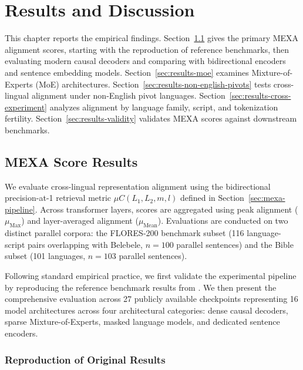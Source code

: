 \chapter{Results and Discussion}
\label{ch:results}

This chapter reports the empirical findings. Section~\ref{sec:results-mexa} gives the primary MEXA alignment scores, starting with the reproduction of reference benchmarks, then evaluating modern causal decoders and comparing with bidirectional encoders and sentence embedding models. Section~\ref{sec:results-moe} examines Mixture-of-Experts (MoE) architectures. Section~\ref{sec:results-non-english-pivots} tests cross-lingual alignment under non-English pivot languages. Section~\ref{sec:results-cross-experiment} analyzes alignment by language family, script, and tokenization fertility. Section~\ref{sec:results-validity} validates MEXA scores against downstream benchmarks.

\section{MEXA Score Results}
\label{sec:results-mexa}

We evaluate cross-lingual representation alignment using the bidirectional precision-at-1 retrieval metric $\mu C(L_1, L_2, m, l)$ defined in Section~\ref{sec:mexa-pipeline}. Across transformer layers, scores are aggregated using peak alignment ($\mu_{\text{Max}}$) and layer-averaged alignment ($\mu_{\text{Mean}}$). Evaluations are conducted on two distinct parallel corpora: the FLORES-200 benchmark subset (116 language-script pairs overlapping with Belebele, $n = 100$ parallel sentences) and the Bible subset (101 languages, $n = 103$ parallel sentences).

Following standard empirical practice, we first validate the experimental pipeline by reproducing the reference benchmark results from \citet{kargaran2025mexa}. We then present the comprehensive evaluation across 27 publicly available checkpoints representing 16 model architectures across four architectural categories: dense causal decoders, sparse Mixture-of-Experts, masked language models, and dedicated sentence encoders.

\subsection{Reproduction of Original Results}
\label{subsec:results-reproduction}

